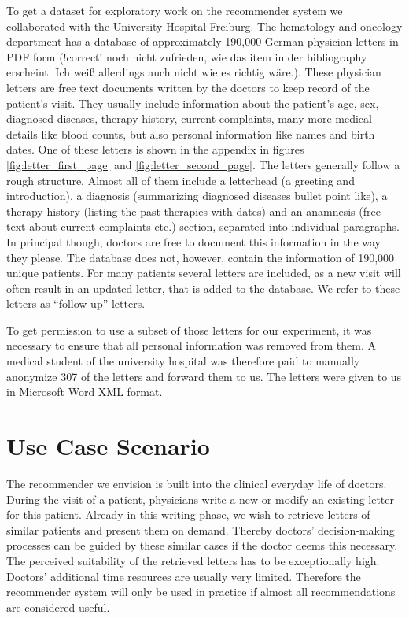 To get a dataset for exploratory work on the recommender system we collaborated with the University Hospital Freiburg. The hematology and oncology department has a database of approximately 190,000 German
physician letters in PDF form \citep{spadaro2012} (!correct! noch nicht zufrieden, wie das item in der bibliography erscheint. Ich weiß allerdings auch nicht wie es richtig wäre.). These physician letters are free text documents
written by the doctors to keep record of the patient's visit. They
usually include information about the patient's age, sex, diagnosed
diseases, therapy history, current complaints, many more medical details
like blood counts, but also personal information like names and birth dates. One of these letters is shown in the appendix in figures \ref{fig:letter_first_page} and \ref{fig:letter_second_page}.
The letters generally follow a rough structure. Almost all of them include a letterhead (a greeting and introduction), a diagnosis (summarizing diagnosed diseases bullet point like), a therapy history (listing the past therapies with dates) and an anamnesis (free text about current complaints etc.) section, separated into individual paragraphs. In principal though, doctors are free to document this information in the way they please. The database does not, however, contain the information of 190,000 unique patients. For many patients several letters are included, as a new visit will often result in an updated letter, that is added to the database. We refer to these letters as ``follow-up'' letters.

To get permission to use a subset of those letters for our experiment, it was necessary to ensure that all personal information was removed from them. A medical student of the university hospital was therefore paid to manually anonymize 307 of the letters and forward them to us. The letters were given to us in Microsoft Word XML format.

\section{Use Case Scenario}
The recommender we envision is built into the clinical everyday life of doctors. During the visit of a patient, physicians write a new or modify an existing letter for this patient. Already in this writing phase, we wish to retrieve letters of similar patients and present them on demand. Thereby doctors' decision-making processes can be guided by these similar cases if the doctor deems this necessary. The perceived suitability of the retrieved letters has to be exceptionally high. Doctors' additional time resources are usually very limited. Therefore the recommender system will only be used in practice if almost all recommendations are considered useful.

